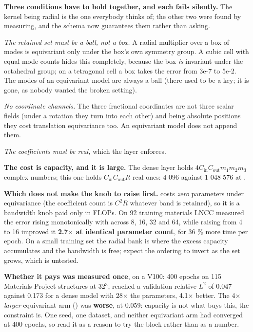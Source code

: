 \textbf{Three conditions have to hold together, and each fails silently.} The kernel being radial is the one everybody thinks of; the other two were found by measuring, and the schema now guarantees them rather than asking.

\emph{The retained set must be a ball, not a box.} A radial multiplier over a box of modes is equivariant only under the box's own symmetry group. A cubic cell with equal mode counts hides this completely, because the box \emph{is} invariant under the octahedral group; on a tetragonal cell a box takes the error from 3e-7 to 5e-2. The modes of an equivariant model are always a ball (there used to be a  key; it is gone, as nobody wanted the broken setting).

\emph{No coordinate channels.} The three fractional coordinates are not three scalar fields (under a rotation they turn into each other) and being absolute positions they cost translation equivariance too. An equivariant model does not append them.

\emph{The coefficients must be real,} which the layer enforces.

\textbf{The cost is capacity, and it is large.} The dense layer holds $4C_\mathrm{in}C_\mathrm{out}m_1m_2m_3$ complex numbers; this one holds $C_\mathrm{in}C_\mathrm{out}R$ real ones: 4 096 against 1 048 576 at .

\textbf{Which does not make  the knob to raise first.}  costs \emph{zero} parameters under equivariance (the coefficient count is $C^2R$ whatever band is retained), so it is a bandwidth knob paid only in FLOPs. On 92 training materials LNCC measured the error rising monotonically with  across 8, 16, 32 and 64, while raising  from 4 to 16 improved it \textbf{2.7$\times$ at identical parameter count}, for 36 \% more time per epoch. On a small training set the radial bank is where the excess capacity accumulates and the bandwidth is free; expect the ordering to invert as the set grows, which is untested.

\textbf{Whether it pays was measured once}, on a V100: 400 epochs on 115 Materials Project structures at 32$^3$,  reached a validation relative $L^2$ of 0.047 against 0.173 for a dense model with 28$\times$ the parameters, 4.1$\times$ better. The 4$\times$ \emph{larger} equivariant arm () was \textbf{worse}, at 0.059: capacity is not what buys this, the constraint is. One seed, one dataset, and neither equivariant arm had converged at 400 epochs, so read it as a reason to try the block rather than as a number.

